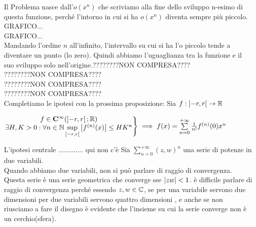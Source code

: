 Il Problema nasce dall'$o(x^n)$ che scriviamo alla fine dello sviluppo n-esimo di questa funzione, perché l'intorno in cui si ha $o(x^n)$ diventa sempre più piccolo.
GRAFICO...\\
GRAFICO...\\
Mandando l'ordine $n$ all'infinito, l'intervallo su cui si ha l'o piccolo tende a diventare un punto (lo zero). Quindi abbiamo l'uguaglianza tra la funzione e il suo sviluppo solo nell'origine.????????NON COMPRESA????\\
????????NON COMPRESA????\\
????????NON COMPRESA????\\
????????NON COMPRESA????\\
Completiamo le ipotesi con la prossima proposizione:
\proposition
Sia $f:\left]-r,r\right[\to \mathbb{R}$
\begin{center}
	$\left.\begin{matrix}
	f\in \mathbf{C^{\infty}}(\left]-r,r\right[; \mathbb{R})\\
	\exists H,K >0 :\forall n\in\mathbb{N} \sup\limits_{\left]-r,r\right[}\left|f^{(n)}(x)\right| \leq HK^n\\
	\end{matrix}\right\}
	\implies f(x)=\sum\limits_{n=0}^{+\infty}\frac{1}{n!}f^{(n)}(0)x^n$
\end{center}
\observation
L'ipotesi centrale ............. qui non c'è
\observation
Sia $\sum\limits_{n=0}^{+\infty}(z,w)^n$ una serie di potenze in due variabili.\\
Quando abbiamo due variabili, non si può parlare di raggio di convergenza. Questa serie è una serie geometrica che converge sse $\left|zw\right|<1$. è  difficile parlare di raggio di convergenza  perché essendo $z,w\in\mathbb{C}$, se per una variabile servono due dimensioni per due variabili servono quattro dimensioni , e anche se non riusciamo a fare il disegno è evidente che l'insieme su cui la serie converge non è un cerchio(sfera).
